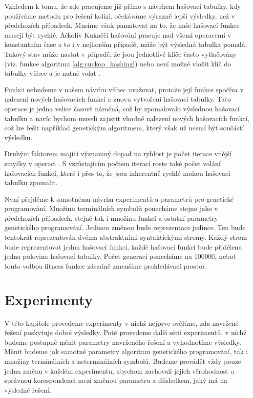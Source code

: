 Vzhledem k tomu, že zde pracujeme již přímo s návrhem hašovací tabulky, kdy používáme metodu pro
řešení kolizí, očekáváme výrazně lepší výsledky, než v předchozích případech. Musíme však pamatovat
na to, že naše hašovací funkce musejí být rychlé. Ačkoliv Kukaččí hašování pracuje nad všemi
operacemi v konstantním čase a to i v nejhorším případě, může být výsledná tabulka pomalá. Takový
stav může nastat v případě, že jsou jednotlivé klíče často vytlačovány (viz. funkce 
algoritmu \ref{alg:cuckoo_hashing}) nebo není možné vložit klíč do tabulky vůbec a je nutné
volat . 

Funkci  nebudeme v našem návrhu vůbec uvažovat, protože její funkce spočíva v nalezení
nových hašovacích funkcí a znovu vytvoření hašovací tabulky. Tato operace je jedna velice časově
náročná, což by zpomalovalo výslednou hašovací tabulku a navíc bychom museli zajistit vhodné nalezení
nových hašovacích funkcí, což lze řešit například genetickým algoritmem, který však už nesmí být
součástí výsledku.

Druhým faktorem mající významný dopad na ryhlost je počet iterace vnější smyčky v operaci
. S vzrůstajícím počtem iterací roste také počet volání hašovacích funkcí, které
i přes to, že jsou inherentně rychlé mohou hašovací tabulku zpomalit.

Nyní přejděme k samotnému návrhu experimentů a parametrů pro genetické programování. Množinu termínálních
symbolů ponecháme stejno jako v předchozích případech, stejně tak i množinu funkcí a ostatní parametry
genetického programování. Jedinou změnou bude reprezentace jedince. Ten bude tentokrát reprezentován
dvěma abstraktními syntaktickými stromy. Každý strom bude reprezentovat jednu hašovací funkci, každé
hašovací funkci bude přidělena jedna polovina hašovací tabulky. Počet generací ponecháme na 100000,
neboť touto volbou fitness funkce zásadně zmenšíme prohledávací prostor.

\chapter{Experimenty}

V této kapitole provedeme experimenty v nichž nejprve ověříme, zda navržené řešení poskytuje dobré
výsledky. Poté provedeme další sérii experimentů, v níchž budeme postupně měnit parametry navrženého
řešení a vyhodnotíme výsledky. Měnit budeme jak samotné parametry algoritmu genetického
programování, tak i množiny terminálních a neterminálních symbolů. Budeme provádět vždy pouze
jednu změnu v každém experimentu, abychom zachovali jejich věrohodnost a správnou korespondenci
mezi změnou parametru a důsledkem, jaký má na výsledné řešení.

